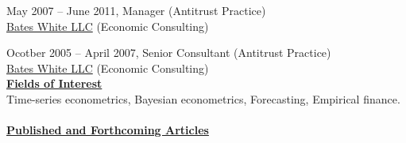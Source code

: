 \documentclass[12pt]{article}
\begin{document}
May 2007 -- June 2011, Manager (Antitrust Practice)\\
\hspace*{10mm} \underline{Bates White LLC} (Economic Consulting)

Ocotber 2005 -- April 2007, Senior Consultant (Antitrust Practice) \\
\hspace*{10mm} \underline{Bates White LLC} (Economic Consulting)\\

\underline{\textbf{Fields of Interest}}\\
Time-series econometrics, Bayesian econometrics, Forecasting, Empirical finance.\\ \\
\underline{\textbf{Published and Forthcoming Articles}}
\end{document}
